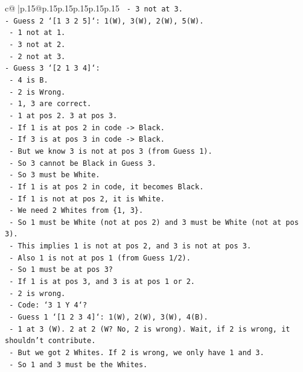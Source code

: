 \documentclass{article}
\begin{document}
{\begin{supertabular}{c@{$\;$}|p{.15\linewidth}@{}p{.15\linewidth}p{.15\linewidth}p{.15\linewidth}p{.15\linewidth}p{.15\linewidth}}
{{{\texttt{  {-} 3 not at 3.} \\
\texttt{{-} Guess 2 `{[}1 3 2 5{]}`: 1(W), 3(W), 2(W), 5(W).} \\
\texttt{  {-} 1 not at 1.} \\
\texttt{  {-} 3 not at 2.} \\
\texttt{  {-} 2 not at 3.} \\
\texttt{{-} Guess 3 `{[}2 1 3 4{]}`:} \\
\texttt{  {-} 4 is B.} \\
\texttt{  {-} 2 is Wrong.} \\
\texttt{  {-} 1, 3 are correct.} \\
\texttt{  {-} 1 at pos 2. 3 at pos 3.} \\
\texttt{  {-} If 1 is at pos 2 in code {-}> Black.} \\
\texttt{  {-} If 3 is at pos 3 in code {-}> Black.} \\
\texttt{  {-} But we know 3 is not at pos 3 (from Guess 1).} \\
\texttt{  {-} So 3 cannot be Black in Guess 3.} \\
\texttt{  {-} So 3 must be White.} \\
\texttt{  {-} If 1 is at pos 2 in code, it becomes Black.} \\
\texttt{  {-} If 1 is not at pos 2, it is White.} \\
\texttt{  {-} We need 2 Whites from \{1, 3\}.} \\
\texttt{  {-} So 1 must be White (not at pos 2) and 3 must be White (not at pos 3).} \\
\texttt{  {-} This implies 1 is not at pos 2, and 3 is not at pos 3.} \\
\texttt{  {-} Also 1 is not at pos 1 (from Guess 1/2).} \\
\texttt{  {-} So 1 must be at pos 3?} \\
\texttt{  {-} If 1 is at pos 3, and 3 is at pos 1 or 2.} \\
\texttt{  {-} 2 is wrong.} \\
\texttt{  {-} Code: `3 1 Y 4`?} \\
\texttt{    {-} Guess 1 `{[}1 2 3 4{]}`: 1(W), 2(W), 3(W), 4(B).} \\
\texttt{      {-} 1 at 3 (W). 2 at 2 (W? No, 2 is wrong). Wait, if 2 is wrong, it shouldn't contribute.} \\
\texttt{      {-} But we got 2 Whites. If 2 is wrong, we only have 1 and 3.} \\
\texttt{      {-} So 1 and 3 must be the Whites.} \\
}}}
\end{supertabular}}
\end{document}
